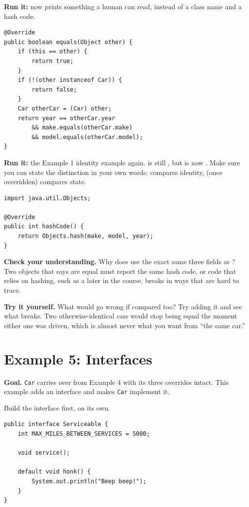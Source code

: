 \documentclass[11pt]{article}
\begin{document}
\textbf{Run it:}  now prints something a human
can read, instead of a class name and a hash code.

\begin{lstlisting}[style=java]
@Override
public boolean equals(Object other) {
    if (this == other) {
        return true;
    }
    if (!(other instanceof Car)) {
        return false;
    }
    Car otherCar = (Car) other;
    return year == otherCar.year
        && make.equals(otherCar.make)
        && model.equals(otherCar.model);
}
\end{lstlisting}

\textbf{Run it:} the Example 1 identity example again. 
is still , but  is now . Make
sure you can state the distinction in your own words: \cmd{==} compares
identity,  (once overridden) compares state.

\begin{lstlisting}[style=java]
import java.util.Objects;

@Override
public int hashCode() {
    return Objects.hash(make, model, year);
}
\end{lstlisting}

\textbf{Check your understanding.} Why does  use the exact same
three fields as ? Two objects that  says are equal
must report the same hash code, or code that relies on hashing, such as a
 later in the course, breaks in ways that are hard to trace.

\textbf{Try it yourself.} What would go wrong if  compared
 too? Try adding it and see what breaks. Two otherwise-identical
cars would stop being equal the moment either one was driven, which is almost
never what you want from ``the same car.''

\section{Example 5: Interfaces}

\textbf{Goal.} \texttt{Car} carries over from Example 4 with its three
overrides intact. This example adds an interface and makes \texttt{Car}
implement it.

Build the interface first, on its own.

\begin{lstlisting}[style=java]
public interface Serviceable {
    int MAX_MILES_BETWEEN_SERVICES = 5000;

    void service();

    default void honk() {
        System.out.println("Beep beep!");
    }
}
\end{lstlisting}
\end{document}
